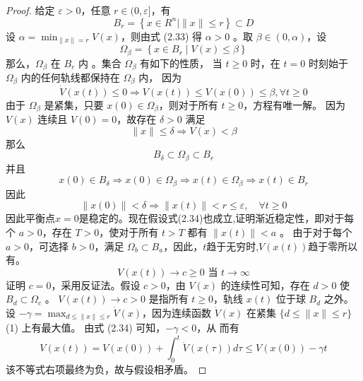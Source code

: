 \begin{proof}
    给定 $\varepsilon>0$，任意 $r \in(0,\varepsilon]$，有
    \begin{equation}
        B_r=\left\{x \in R^n \mid\|x\| \leqslant r\right\} \subset D
    \end{equation}
    设 $\alpha=\min _{\|x\|=r} V(x)$，则由式 (2.33) 得 $\alpha>0$ 。取 $\beta \in(0,\alpha)$，设
    \begin{equation}
        \Omega_\beta=\left\{x \in B_r \mid V(x) \leqslant \beta\right\}
    \end{equation}
    那么，$\Omega_\beta$ 在 $B_r$ 内  。集合 $\Omega_\beta$ 有如下的性质，
    当 $t \geqslant 0$ 时，在 $t=0$ 时刻始于 $\Omega_\beta$ 内的任何轨线都保持在 $\Omega_\beta$ 内， 因为
    \begin{equation}
        \dot{V}(x(t)) \leqslant 0 \Rightarrow V(x(t)) \leqslant V(x(0)) \leqslant \beta,\forall t \geqslant 0
    \end{equation}
    由于 $\Omega_\beta$ 是紧集，只要 $x(0) \in \Omega_\beta$，则对于所有 $t \geqslant 0$，方程有唯一解。
    因为 $V(x)$ 连续且 $V(0)=0$，故存在 $\delta>0$ 满足
    \begin{equation}
        \|x\| \leqslant \delta \Rightarrow V(x)<\beta
    \end{equation}
    那么
    \begin{equation}
        B_\delta \subset \Omega_\beta \subset B_r
    \end{equation}
    并且
    \begin{equation}
        x(0) \in B_\delta \Rightarrow x(0) \in \Omega_\beta \Rightarrow x(t) \in \Omega_\beta \Rightarrow x(t) \in B_r
    \end{equation}
    因此
    \begin{equation}
        \|x(0)\|<\delta \Rightarrow\|x(t)\|<r \leqslant \varepsilon,\quad \forall t \geqslant 0
    \end{equation}
    因此平衡点$x=0$是稳定的。现在假设式(2.34)也成立,证明渐近稳定性，即对于每个 $a>0$，存在 $T>0$，使对于所有 $t>T$ 都有 $\|x(t)\|<a$ 。
    由于对于每个 $a>0$，可选择 $b>0$，满足 $\Omega_b \subset B_a$，因此，$t$趋于无穷时,$V(x(t))$趋于零所以有。
    \begin{equation}
        V(x(t)) \rightarrow c \geqslant 0 \text { 当 } t \rightarrow \infty
    \end{equation}
    证明 $c=0$，采用反证法。假设 $c>0$，由 $V(x)$ 的连续性可知，存在 $d>0$ 使 $B_d \subset \Omega_c$ 。
    $V(x(t)) \rightarrow c>0$ 是指所有 $t \geqslant 0$，轨线 $x(t)$ 位于球 $B_d$ 之外。
    设 $-\gamma=\max _{d \leqslant\|x\| \leqslant r} \dot{V}(x)$，因为连续函数 $\dot{V}(x)$ 在紧集 $\{d \leqslant\|x\| \leqslant r\}$ (1) 上有最大值。
    由式 (2.34) 可知，$-\gamma<0$，从 而有
    \begin{equation}
        V(x(t))=V(x(0))+\int_0^t \dot{V}(x(\tau)) d \tau \leqslant V(x(0))-\gamma t
    \end{equation}
    该不等式右项最终为负，故与假设相矛盾。
\end{proof}
